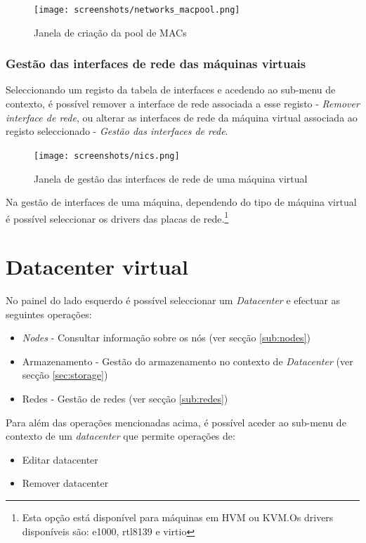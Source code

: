 \begin{figure}[H]
	\begin{center}
	\texttt{[image: screenshots/networks\_macpool.png]}
	\caption{Janela de criação da pool de MACs}
	\label{fig:networks_macpool}
	\end{center}
\end{figure}


\subsubsection{Gestão das interfaces de rede das máquinas virtuais}
Seleccionando um registo da tabela de interfaces e acedendo ao sub-menu de contexto, é possível remover a interface de rede associada a esse registo - \emph{Remover interface de rede}, ou alterar as interfaces de rede da máquina virtual associada ao registo seleccionado - \emph{Gestão das interfaces de rede}.

\begin{figure}[H]
	\begin{center}
	\texttt{[image: screenshots/nics.png]}
	\caption{Janela de gestão das interfaces de rede de uma máquina virtual}
	\label{fig:nics}
	\end{center}
\end{figure}

Na gestão de interfaces de uma máquina, dependendo do tipo de máquina virtual é possível seleccionar os drivers das placas de rede.\footnote{Esta opção está disponível para máquinas em HVM ou KVM.Os drivers disponíveis são: e1000, rtl8139 e virtio}

\section{Datacenter virtual}
\label{sec:cluster}

No painel do lado esquerdo é possível seleccionar um \emph{Datacenter} e efectuar as seguintes operações:

\begin{itemize}
    \item \emph{Nodes} - Consultar informação sobre os nós (ver secção \ref{sub:nodes})
    \item Armazenamento - Gestão do armazenamento no contexto de \emph{Datacenter} (ver secção \ref{sec:storage})
    \item Redes - Gestão de redes (ver secção \ref{sub:redes})
\end{itemize}

Para além das operações mencionadas acima, é possível aceder ao sub-menu de contexto de um \emph{datacenter} que permite operações de:
\begin{itemize}
    \item Editar datacenter
    \item Remover datacenter
\end{itemize}

